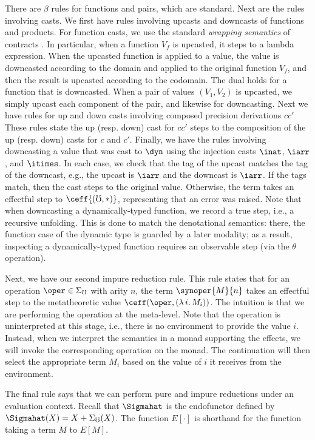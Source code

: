 \documentclass[acmsmall,screen,review,anonymous]{acmart}
\theoremstyle{remark}
\begin{document}
There are $\beta$ rules for functions and pairs, which are standard. Next are
the rules involving casts. We first have rules involving upcasts and downcasts
of functions and products.
%
For function casts, we use the standard \emph{wrapping semantics} of contracts
\cite{findler-felleisen02}. In particular, when a function $V_f$ is upcasted, it
steps to a lambda expression. When the upcasted function is applied to a value,
the value is downcasted according to the domain and applied to the original
function $V_f$, and then the result is upcasted according to the codomain. The
dual holds for a function that is downcasted.
%
When a pair of values $(V_1, V_2)$ is upcasted, we simply upcast each component
of the pair, and likewise for downcasting.
%
Next we have rules for up and down casts involving composed precision
derivations $cc'$ These rules state the up (resp. down) cast for $cc'$ steps to
the composition of the up (resp. down) casts for $c$ and $c'$.
%
Finally, we have the rules involving downcasting a value that was cast to $\dyn$
using the injection casts $\inat$, $\iarr$, and $\itimes$. In each case, we
check that the tag of the upcast matches the tag of the downcast, e.g., the
upcast is $\iarr$ and the downcast is $\iarr$. If the tags match, then the cast
steps to the original value. Otherwise, the term takes an effectful step to
$\ceff{(\mho, *)}$, representing that an error was raised. Note that when
downcasting a dynamically-typed function, we record a true step, i.e., a
recursive unfolding. This is done to match the denotational semantics: there,
the function case of the dynamic type is guarded by a later modality; as a
result, inspecting a dynamically-typed function requires an observable step (via
the $\theta$ operation).

Next, we have our second impure reduction rule. This rule states that for an
operation $\oper \in \Sigma_\mho$ with arity $n$, the term $\synoper{M}{n}$
takes an effectful step to the metatheoretic value $\ceff(\oper, (\lambda\, i.\,
M_i))$. The intuition is that we are performing the operation at the meta-level.
%
Note that the operation is uninterpreted at this stage, i.e., there is no
environment to provide the value $i$. Instead, when we interpret the semantics
in a monad supporting the effects, we will invoke the corresponding operation on
the monad. The continuation will then select the appropriate term $M_i$ based on
the value of $i$ it receives from the environment.

The final rule says that we can perform pure and impure reductions under an
evaluation context. Recall that $\Sigmahat$ is the endofunctor defined by
$\Sigmahat(X) = X + \Sigma_\mho(X)$. The function $E[\cdot]$ is shorthand for
the function taking a term $M$ to $E[M]$.
\end{document}
